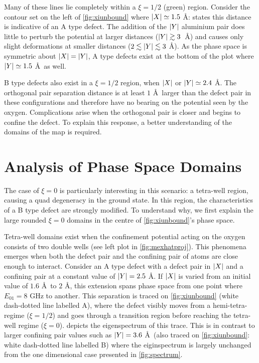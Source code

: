 Many of these lines lie completely within a $\xi = 1/2$ (green) region.
Consider the contour set on the left of \cref{fig:xiunbound} where $\lvert X\rvert \simeq 1.5$ \AA:  states this distance is indicative of an A type defect.
The addition of the $\lvert Y\rvert$ aluminium pair does little to perturb the potential at larger distances ($\lvert Y\rvert \gtrsim 3$~\AA) and causes only slight deformations at smaller distances ($2 \lesssim \lvert Y\rvert \lesssim 3$ \AA).
As the phase space is symmetric about $\lvert X\rvert = \lvert Y\rvert$, A type defects exist at the bottom of the plot where $\lvert Y\rvert \simeq 1.5$ \AA\ as well.

B type defects also exist in a $\xi = 1/2$ region, when $\lvert X\rvert$ or $\lvert Y\rvert \simeq 2.4$ \AA.
The orthogonal pair separation distance is at least $1$ \AA\ larger than the defect pair in these configurations and therefore have no bearing on the potential seen by the oxygen.
Complications arise when the orthogonal pair is closer and begins to confine the defect.
To explain this response, a better understanding of the domains of the map is required.

\section{Analysis of Phase Space Domains}\label{sec:phaseanalysis}

The case of $\xi = 0$ is particularly interesting in this scenario: a tetra-well region, causing a quad degeneracy in the ground state.
In this region, the characteristics of a B type defect are strongly modified.
To understand why, we first explain the large rounded $\xi = 0$ domains in the centre of \cref{fig:xiunbound}'s phase space.

Tetra-well domains exist when the confinement potential acting on the oxygen consists of two double wells (see left plot in \cref{fig:mexhatproj}).
This phenomena emerges when both the defect pair and the confining pair of atoms are close enough to interact.
Consider an A type defect with a defect pair in $\lvert X\rvert$ and a confining pair at a constant value of $\lvert Y\rvert = 2.5$ \AA.
If $\lvert X\rvert$ is varied from an initial value of $1.6$ \AA\ to $2$ \AA, this extension spans phase space from one point where $E_{01} = 8$ GHz to another.
This separation is traced on \cref{fig:xiunbound} (white dash-dotted line labelled A), where the defect visibly moves from a hemi-tetra- regime ($\xi = 1/2$) and goes through a transition region before reaching the tetra-well regime ($\xi = 0$).
 depicts the eigenspectrum of this trace.
This is in contrast to larger confining pair values such as $\lvert Y\rvert = 3.6$ \AA\ (also traced on \cref{fig:xiunbound}: white dash-dotted line labelled B) where the eiginspectrum is largely unchanged from the one dimensional case presented in \cref{fig:spectrum}.

